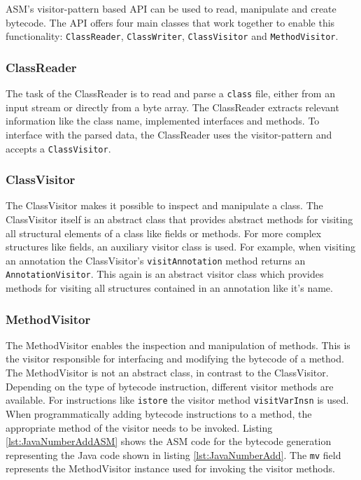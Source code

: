 ASM's visitor-pattern based API can be used to read, manipulate and create bytecode. The API offers four main classes that work together to enable this functionality: \texttt{ClassReader}, \texttt{ClassWriter}, \texttt{ClassVisitor} and \texttt{MethodVisitor}. 

\subsubsection{ClassReader}

The task of the ClassReader is to read and parse a \texttt{class} file, either from an input stream or directly from a byte array. The ClassReader extracts relevant information like the class name, implemented interfaces and methods. To interface with the parsed data, the ClassReader uses the visitor-pattern and accepts a \texttt{ClassVisitor}. 

\subsubsection{ClassVisitor}

The ClassVisitor makes it possible to inspect and manipulate a class. The ClassVisitor itself is an abstract class that provides abstract methods for visiting all structural elements of a class like fields or methods. For more complex structures like fields, an auxiliary visitor class is used. For example, when visiting an annotation the ClassVisitor's \texttt{visitAnnotation} method returns an \texttt{AnnotationVisitor}. This again is an abstract visitor class which provides methods for visiting all structures contained in an annotation like it's name. 

\subsubsection{MethodVisitor}

The MethodVisitor enables the inspection and manipulation of methods. This is the visitor responsible for interfacing and modifying the bytecode of a method. The MethodVisitor is not an abstract class, in contrast to the ClassVisitor. Depending on the type of bytecode instruction, different visitor methods are available. For instructions like \texttt{istore} the visitor method \texttt{visitVarInsn} is used. When programmatically adding bytecode instructions to a method, the appropriate method of the visitor needs to be invoked. Listing \ref{lst:JavaNumberAddASM} shows the ASM code for the bytecode generation representing the Java code shown in listing \ref{lst:JavaNumberAdd}. The \texttt{mv} field represents the MethodVisitor instance used for invoking the visitor methods.


